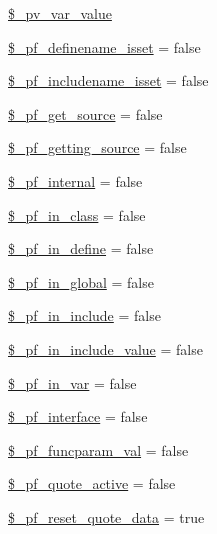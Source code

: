 \begin{DoxyCompactItemize}
\item 
\hyperlink{classphp_documentor_t_parser_a7d0fedac92de56941f5d85a60cf88b4c}{\$\-\_\-pv\-\_\-var\-\_\-value}
\item 
\hyperlink{classphp_documentor_t_parser_acb33ef4b7e35c788940acaefeb0ec1d0}{\$\-\_\-pf\-\_\-definename\-\_\-isset} = false
\item 
\hyperlink{classphp_documentor_t_parser_ae1d4b7020a88cbd7e0315d8c8c0e0ee0}{\$\-\_\-pf\-\_\-includename\-\_\-isset} = false
\item 
\hyperlink{classphp_documentor_t_parser_add5096c29b8d12e57e62d2bb97bd1322}{\$\-\_\-pf\-\_\-get\-\_\-source} = false
\item 
\hyperlink{classphp_documentor_t_parser_abec653d627ef89659e91c38819b5ed0c}{\$\-\_\-pf\-\_\-getting\-\_\-source} = false
\item 
\hyperlink{classphp_documentor_t_parser_afdf5982b7549fcf54370acd998346e3f}{\$\-\_\-pf\-\_\-internal} = false
\item 
\hyperlink{classphp_documentor_t_parser_a05225b1302c96d951dca7f704fa1e244}{\$\-\_\-pf\-\_\-in\-\_\-class} = false
\item 
\hyperlink{classphp_documentor_t_parser_a039ffcad54c3d9cd69c82f918b0c0885}{\$\-\_\-pf\-\_\-in\-\_\-define} = false
\item 
\hyperlink{classphp_documentor_t_parser_a53eae1334135d01847138613fdfe0968}{\$\-\_\-pf\-\_\-in\-\_\-global} = false
\item 
\hyperlink{classphp_documentor_t_parser_a3465f13bbbb6dc7da2245473b90da9ce}{\$\-\_\-pf\-\_\-in\-\_\-include} = false
\item 
\hyperlink{classphp_documentor_t_parser_ab95dd6c20f1af472fbba4915d82f6c14}{\$\-\_\-pf\-\_\-in\-\_\-include\-\_\-value} = false
\item 
\hyperlink{classphp_documentor_t_parser_a5f358785d66d9de6a59d137afc5407a0}{\$\-\_\-pf\-\_\-in\-\_\-var} = false
\item 
\hyperlink{classphp_documentor_t_parser_a7ca295ea098fa00d8e45c86982ee71dd}{\$\-\_\-pf\-\_\-interface} = false
\item 
\hyperlink{classphp_documentor_t_parser_af08dd609d081b2d3d53004cf11b9bc51}{\$\-\_\-pf\-\_\-funcparam\-\_\-val} = false
\item 
\hyperlink{classphp_documentor_t_parser_afa6b6c4c73356ac2788cef1e30cb34eb}{\$\-\_\-pf\-\_\-quote\-\_\-active} = false
\item 
\hyperlink{classphp_documentor_t_parser_a0dbb69c8dfded9a05068866e708d4fa8}{\$\-\_\-pf\-\_\-reset\-\_\-quote\-\_\-data} = true

\end{DoxyCompactItemize}
